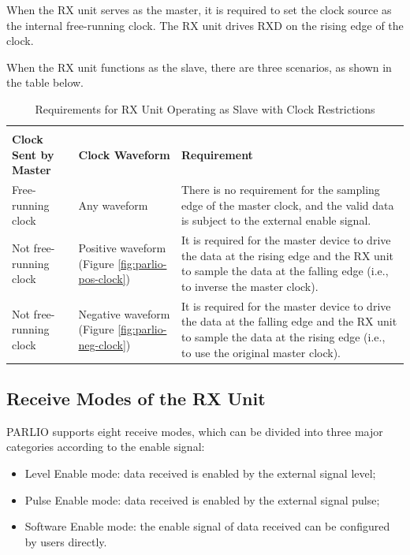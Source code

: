 \documentclass[main\_\_EN.tex]{subfiles}
\begin{document}
When the RX unit serves as the master, it is required to set the clock source as the internal free-running clock. The RX unit drives RXD on the rising edge of the clock.

When the RX unit functions as the slave, there are three scenarios, as shown in the table below.

\begin{table}[H]
    \centering
    \caption{Requirements for RX Unit Operating as Slave with Clock Restrictions}
    \label{tab:parlio-rx-slave-restriction}

    \begin{tabular}{|l|p{3cm}|p{9cm}|}
    \hline
        \rowcolor{lightgray}
        \multicolumn{2}{|c|}{\textbf{Clock Restriction}} & \\
        \rowcolor{lightgray}
        \textbf{Clock Sent by Master} &\textbf{Clock Waveform} & \multirow{-2}{*}{\textbf{Requirement}} \\ \hline

        Free-running clock    & Any waveform  & There is no requirement for the sampling edge of the master clock, and the valid data is subject to the external enable signal. \\ \hline
        Not free-running clock  & Positive waveform (Figure \ref{fig:parlio-pos-clock}) & It is required for the master device to drive the data at the rising edge and the RX unit to sample the data at the falling edge (i.e., to inverse the master clock).    \\ \hline
        Not free-running clock  & Negative waveform (Figure \ref{fig:parlio-neg-clock})  & It is required for the master device to drive the data at the falling edge and the RX unit to sample the data at the rising edge (i.e., to use the original master clock). \\ \hline
    \end{tabular}
\end{table}


\subsection{Receive Modes of the RX Unit}

PARLIO supports eight receive modes, which can be divided into three major categories according to the enable signal:

\begin{itemize}
    \item Level Enable mode: data received is enabled by the external signal level;
    \item Pulse Enable mode: data received is enabled by the external signal pulse;
    \item Software Enable mode: the enable signal of data received can be configured by users directly.
\end{itemize}
\end{document}

